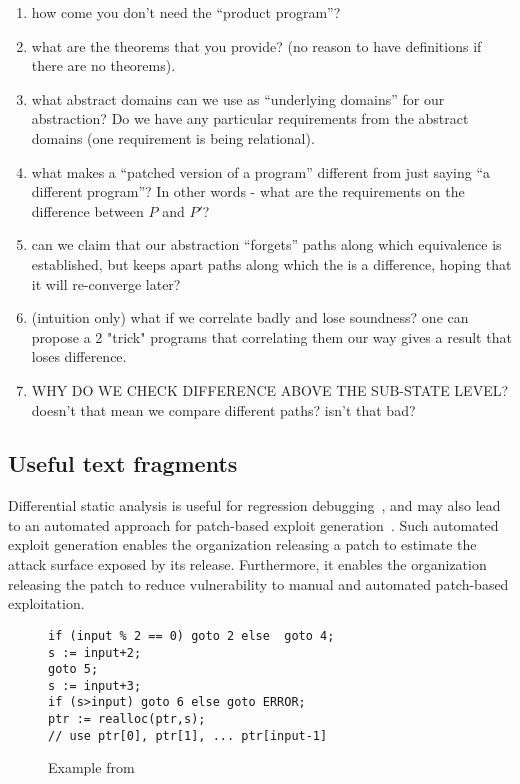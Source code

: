 \begin{enumerate}
\item how come you don't need the ``product program''?
\item what are the theorems that you provide? (no reason to have definitions if there are no theorems).
\item what abstract domains can we use as ``underlying domains'' for our abstraction? Do we have any particular requirements from the abstract domains (one requirement is being relational).
\item what makes a ``patched version of a program'' different from just saying ``a different program''? In other words - what are the requirements on the difference between $P$ and $P'$?
\item can we claim that our abstraction ``forgets'' paths along which equivalence is established, but keeps apart paths along which the is a difference, hoping that it will re-converge later?
\item (intuition only) what if we correlate badly and lose soundness? one can propose a 2 "trick" programs that correlating them our way gives a result that loses difference.
\item WHY DO WE CHECK DIFFERENCE ABOVE THE SUB-STATE LEVEL? doesn't that mean we compare different paths? isn't that bad?
\end{enumerate}

\subsection{Useful text fragments}

Differential static analysis is useful for regression debugging~\cite{TODO}, and may also lead to an automated approach for patch-based exploit generation~\cite{TODO}. Such automated exploit generation enables the organization releasing a patch to estimate the attack surface exposed by its release. Furthermore, it enables the organization releasing the patch to reduce vulnerability to manual and automated patch-based exploitation.


\begin{figure}
\begin{lstlisting}
if (input % 2 == 0) goto 2 else  goto 4;
s := input+2;
goto 5;
s := input+3;
if (s>input) goto 6 else goto ERROR;
ptr := realloc(ptr,s);
// use ptr[0], ptr[1], ... ptr[input-1]
\end{lstlisting}
\caption{Example from \cite{TODO}}
\end{figure} 